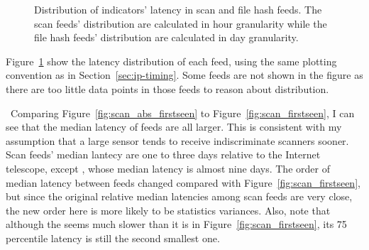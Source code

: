 \begin{figure}[t!]
\centering
{}


\caption{Distribution of indicators' latency in scan and file hash feeds.
The scan feeds' distribution are calculated in hour granularity while
the file hash feeds' distribution are calculated in day granularity.}
\label{fig:abs_firstseen}
\end{figure}


Figure~\ref{fig:abs_firstseen} show the latency distribution of each feed, using
the same plotting convention as in Section~\ref{sec:ip-timing}. Some feeds are not
shown in the figure as there are too little data points in those feeds to reason
about distribution.

\finding\
Comparing Figure~\ref{fig:scan_abs_firstseen} to Figure~\ref{fig:scan_firstseen},
I can see that the median latency of feeds are all larger. This is consistent with
my assumption that a large sensor tends to receive indiscriminate scanners sooner.
Scan feeds' median lantecy are one to three days relative to the Internet telescope,
except {\feedTSAnalyst}, whose median latency is almost nine days.
The order of median latency between feeds changed compared with Figure~\ref{fig:scan_firstseen},
but since the original relative median latencies among scan feeds are very close,
the new order here is more likely to be statistics variances. Also, note that
although the {\feedTSAlienVault} seems much slower than it is in
Figure~\ref{fig:scan_firstseen}, its 75 percentile latency is still the second
smallest one.

